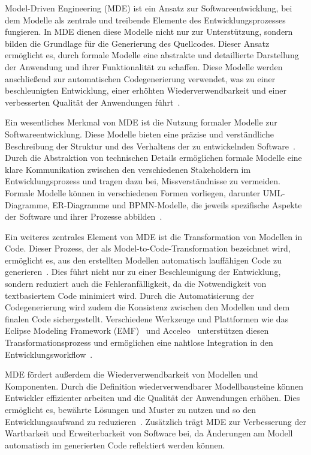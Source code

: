 Model-Driven Engineering (MDE) ist ein Ansatz zur Softwareentwicklung, bei dem Modelle als zentrale und treibende 
Elemente des Entwicklungsprozesses fungieren. In MDE dienen diese Modelle nicht nur zur Unterstützung, sondern 
bilden die Grundlage für die Generierung des Quellcodes. Dieser Ansatz ermöglicht es, durch formale Modelle 
eine abstrakte und detaillierte Darstellung der Anwendung und ihrer Funktionalität zu schaffen. Diese Modelle 
werden anschließend zur automatischen Codegenerierung verwendet, was zu einer beschleunigten Entwicklung, einer 
erhöhten Wiederverwendbarkeit und einer verbesserten Qualität der Anwendungen führt~\cite{Selic_2003}.

Ein wesentliches Merkmal von MDE ist die Nutzung formaler Modelle zur Softwareentwicklung. Diese Modelle bieten 
eine präzise und verständliche Beschreibung der Struktur und des Verhaltens der zu entwickelnden 
Software~\cite{Schmidt_2006}. Durch die Abstraktion von technischen Details ermöglichen formale Modelle 
eine klare Kommunikation zwischen den verschiedenen Stakeholdern im Entwicklungsprozess und tragen dazu bei, 
Missverständnisse zu vermeiden. Formale Modelle können in verschiedenen Formen vorliegen, darunter UML-Diagramme, 
ER-Diagramme und BPMN-Modelle, die jeweils spezifische Aspekte der Software und ihrer Prozesse abbilden~\cite{Selic_2003}.

Ein weiteres zentrales Element von MDE ist die Transformation von Modellen in Code. Dieser Prozess, der als 
Model-to-Code-Transformation bezeichnet wird, ermöglicht es, aus den erstellten Modellen automatisch lauffähigen 
Code zu generieren~\cite{brambilla2017model}. Dies führt nicht nur zu einer Beschleunigung der Entwicklung, sondern 
reduziert auch die Fehleranfälligkeit, da die Notwendigkeit von textbasiertem Code minimiert wird. Durch die Automatisierung der 
Codegenerierung wird zudem die Konsistenz zwischen den Modellen und dem finalen Code sichergestellt. Verschiedene 
Werkzeuge und Plattformen wie das Eclipse Modeling Framework (EMF)~\cite{eclipseEclipse} und 
Acceleo~\cite{eclipseEclipseAcceleo} unterstützen diesen Transformationsprozess 
und ermöglichen eine nahtlose Integration in den Entwicklungsworkflow~\cite{steinberg2008emf}.

MDE fördert außerdem die Wiederverwendbarkeit von Modellen und Komponenten. Durch die Definition wiederverwendbarer 
Modellbausteine können Entwickler effizienter arbeiten und die Qualität der Anwendungen erhöhen. Dies ermöglicht es, 
bewährte Lösungen und Muster zu nutzen und so den Entwicklungsaufwand zu reduzieren~\cite{France_2007}. Zusätzlich 
trägt MDE zur Verbesserung der Wartbarkeit und Erweiterbarkeit von Software bei, da Änderungen am Modell automatisch 
im generierten Code reflektiert werden können.


